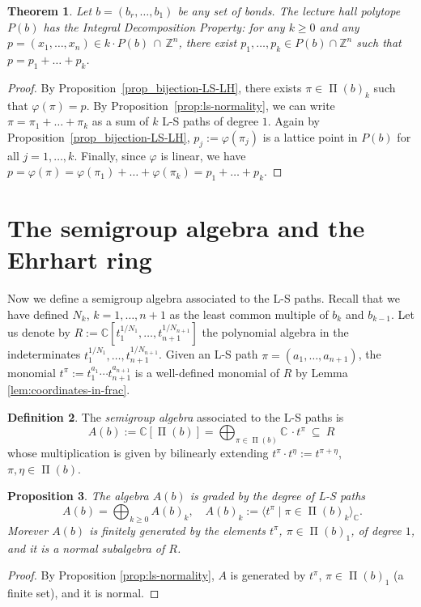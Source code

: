 \documentclass[12pt, a4paper]{amsart}   	%
\numberwithin{equation}{section}
\theoremstyle{plain}
\newtheorem{theorem}{Theorem}[section]
\newtheorem{proposition}[theorem]{Proposition}
\theoremstyle{definition}
\newtheorem{definition}[theorem]{Definition}
\newcommand{\Z}{{\mathbb Z}}
\DeclareMathOperator{\LS}{\Pi}
\newcommand{\CC}{\mathbb{C}}
\begin{document}
\begin{theorem}\label{theorem_IDP_LH}
    Let $b=(b_r,\ldots,b_1)$ be any set of bonds. The lecture hall polytope $P(b)$ has the Integral Decomposition Property: for any $k\geq 0$ and any $p = (x_1, \ldots, x_n)\in k\cdot P(b)\,\cap\,\Z^n$, there exist $p_1, \ldots, p_k\in P(b)\cap\Z^n$ such that $p = p_1 + \ldots + p_k$.
\end{theorem}
\begin{proof} By Proposition~\ref{prop_bijection-LS-LH}, there exists $\pi\in\LS(b)_k$ such that $\varphi(\pi) = p$. By Proposition~\ref{prop:ls-normality}, we can write $\pi = \pi_1 + \ldots + \pi_k$ as a sum of $k$ L-S paths of degree $1$. Again by Proposition~\ref{prop_bijection-LS-LH}, $p_j := \varphi(\pi_j)$ is a lattice point in $P(b)$ for all $j=1,\ldots,k$. Finally, since $\varphi$ is linear, we have $p = \varphi(\pi) = \varphi(\pi_1) + \ldots + \varphi(\pi_k) = p_1 + \ldots + p_k$.
\end{proof}


\section{The semigroup algebra and the Ehrhart ring}\label{section:semigroup-algebra}

Now we define a semigroup algebra associated to the L-S paths. Recall that we have defined $N_k$, $k = 1, \ldots, n+1$ as the least common multiple of $b_k$ and $b_{k-1}$. Let us denote by $R := \CC[t_1^{1/N_1},\dots,t_{n+1}^{1/N_{n+1}}]$ the polynomial algebra in the indeterminates $t_1^{1/N_1},\dots,t_{n+1}^{1/N_{n+1}}$. Given an L-S path $\pi = (a_1,\dots,a_{n+1})$, the monomial $t^\pi := t_1^{a_1}\cdots t_{n+1}^{a_{n+1}}$ is a well-defined monomial of $R$ by Lemma \ref{lem:coordinates-in-frac}.

\begin{definition}\label{def:semigroup-algebra}
The \emph{semigroup algebra} associated to the L-S paths is
\[
A(b) := \CC[\LS(b)] = \bigoplus_{\pi\in \LS(b)} \CC\,\cdot t^\pi \ \subseteq\ R
\]
whose multiplication is given by bilinearly extending $t^\pi\cdot t^\eta := t^{\pi+\eta}$, $\pi,\eta\in\LS(b)$.
\end{definition}
\begin{proposition}\label{prop:A-algebra}
The algebra $A(b)$ is graded by the degree of L-S paths  
\[
\ A(b) = \bigoplus_{k\geq 0} A(b)_k, \quad A(b)_k := \langle t^\pi \mid \pi\in\LS(b)_k\rangle_\CC.
\]
Morever $A(b)$ is finitely generated by the elements $t^\pi$, $\pi\in\LS(b)_1$, of degree $1$, and it is a normal subalgebra of $R$.
\end{proposition}
\begin{proof}
By Proposition \ref{prop:ls-normality}, $A$ is generated by $t^\pi$, $\pi\in\LS(b)_1$ (a finite set), and it is normal.
\end{proof}
\end{document}
